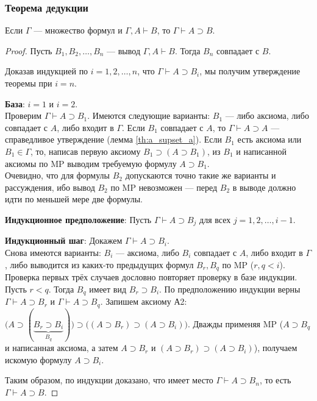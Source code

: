 \subsubsection{Теорема дедукции}
\nobreak\vspace{0.5em}
\nopagebreak
\begin{theorem}\label{th:deduction_th}
    Если $\Gamma$ --- множество формул и $\Gamma, A \vdash B$, то $\Gamma \vdash A \supset B$.
\end{theorem}
\begin{proof}\leavevmode

    Пусть $B_1, B_2, \dots, B_n$ --- вывод $\Gamma, A \vdash B$. Тогда $B_n$ совпадает с $B$. 

    Доказав индукцией по $i = 1, 2, \dots, n$, что $\Gamma \vdash A \supset B_i$, мы получим утверждение теоремы при $i = n$.

    \textbf{База}: $i = 1$ и $i = 2$. \\
    Проверим $\Gamma \vdash A \supset B_1$. Имеются следующие варианты: $B_1$ --- либо аксиома, либо совпадает с $A$, либо входит в $\Gamma$. Если $B_1$ совпадает с $A$, то $\Gamma \vdash A \supset A$ --- справедливое утверждение (лемма \ref{th:a_supset_a}). Если $B_1$ есть аксиома или $B_1 \in \Gamma$, то, написав первую аксиому $B_1 \supset (A \supset B_1)$, из $B_1$ и написанной аксиомы по MP выводим требуемую формулу $A \supset B_1$. \\
    Очевидно, что для формулы $B_2$ допускаются точно такие же варианты и рассуждения, ибо вывод $B_2$ по MP невозможен --- перед $B_2$ в выводе должно идти по меньшей мере две формулы.

    \textbf{Индукционное предположение}: Пусть $\Gamma \vdash A \supset B_j$ для всех $j = 1, 2, \dots, i - 1$.
    
    \textbf{Индукционный шаг}: Докажем $\Gamma \vdash A \supset B_i$. \\
    Снова имеются варианты: $B_i$ --- аксиома, либо $B_i$ совпадает с $A$, либо входит в $\Gamma$, либо выводится из каких-то предыдущих формул $B_r, B_q$ по MP ($r, q < i$). Проверка первых трёх случаев дословно повторяет проверку в базе индукции. Пусть $r < q$. Тогда $B_q$ имеет вид $B_r \supset B_i$. По предположению индукции верны $\Gamma \vdash A \supset B_r$ и $\Gamma \vdash A \supset B_q$. Запишем аксиому А2: $\big(A \supset (\underbrace{B_r \supset B_i}_{B_q})\big) \supset \big((A \supset B_r) \supset (A \supset B_i)\big)$. Дважды применяя MP ($A \supset B_q$ и написанная аксиома, а затем $A \supset B_r$ и $(A \supset B_r) \supset (A \supset B_i)$), получаем искомую формулу $A \supset B_i$.

    Таким образом, по индукции доказано, что имеет место $\Gamma \vdash A \supset B_n$, то есть $\Gamma \vdash A \supset B$.
\end{proof}

